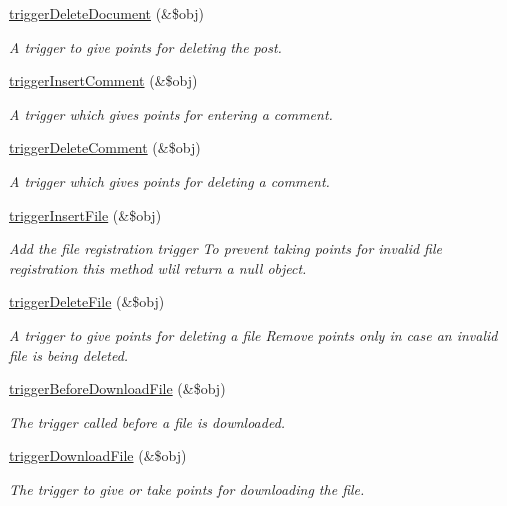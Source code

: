 \begin{DoxyCompactItemize}
\hyperlink{classpointController_a12526b69a68224eccbb3816e8724e4a4}{trigger\-Delete\-Document} (\&\$obj)
\begin{DoxyCompactList}\small\item\em A trigger to give points for deleting the post. \end{DoxyCompactList}\item 
\hyperlink{classpointController_adfd5758c92bb06d2b77ccc3ac432f0c1}{trigger\-Insert\-Comment} (\&\$obj)
\begin{DoxyCompactList}\small\item\em A trigger which gives points for entering a comment. \end{DoxyCompactList}\item 
\hyperlink{classpointController_ac6e1679b70da98f95a3a6cfe190a96f2}{trigger\-Delete\-Comment} (\&\$obj)
\begin{DoxyCompactList}\small\item\em A trigger which gives points for deleting a comment. \end{DoxyCompactList}\item 
\hyperlink{classpointController_a48e790691506d5c5a6feac45e7237e3d}{trigger\-Insert\-File} (\&\$obj)
\begin{DoxyCompactList}\small\item\em Add the file registration trigger To prevent taking points for invalid file registration this method wlil return a null object. \end{DoxyCompactList}\item 
\hyperlink{classpointController_a1d303c7b8ada6f84e53b5d32336bc313}{trigger\-Delete\-File} (\&\$obj)
\begin{DoxyCompactList}\small\item\em A trigger to give points for deleting a file Remove points only in case an invalid file is being deleted. \end{DoxyCompactList}\item 
\hyperlink{classpointController_afa504365e28861dc15a905c46e1f29e3}{trigger\-Before\-Download\-File} (\&\$obj)
\begin{DoxyCompactList}\small\item\em The trigger called before a file is downloaded. \end{DoxyCompactList}\item 
\hyperlink{classpointController_ab6a0e04cef3ea03a427a505ed829c027}{trigger\-Download\-File} (\&\$obj)
\begin{DoxyCompactList}\small\item\em The trigger to give or take points for downloading the file. \end{DoxyCompactList}\item 

\end{DoxyCompactItemize}
